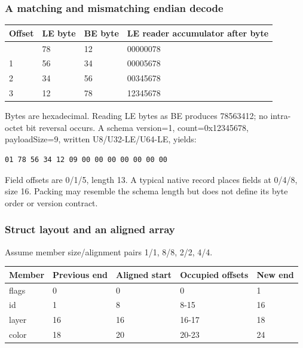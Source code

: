 \hypertarget{appendix-92ff77d4dfdc-m003---bytes-to-physical-memory}{}

\subsubsection{A matching and mismatching endian decode}\label{appendix-92ff77d4dfdc-a-matching-and-mismatching-endian-decode}

\hypertarget{appendix-92ff77d4dfdc-a-matching-and-mismatching-endian-decode}{}

{\def\LTcaptype{none} %
\begin{longtable}[]{@{}llll@{}}
\toprule\noalign{}
Offset & LE byte & BE byte & LE reader accumulator after byte \\
\midrule\noalign{}
\endhead
\bottomrule\noalign{}
\endlastfoot
0 & 78 & 12 & 00000078 \\
1 & 56 & 34 & 00005678 \\
2 & 34 & 56 & 00345678 \\
3 & 12 & 78 & 12345678 \\
\end{longtable}
}

Bytes are hexadecimal. Reading LE bytes as BE produces 78563412; no intra-octet bit reversal occurs. A schema version=1, count=0x12345678, payloadSize=9, written U8/U32-LE/U64-LE, yields:

\begin{verbatim}
01 78 56 34 12 09 00 00 00 00 00 00 00
\end{verbatim}

Field offsets are 0/1/5, length 13. A typical native record places fields at 0/4/8, size 16. Packing may resemble the schema length but does not define its byte order or version contract.

\subsubsection{Struct layout and an aligned array}\label{appendix-92ff77d4dfdc-struct-layout-and-an-aligned-array}

\hypertarget{appendix-92ff77d4dfdc-struct-layout-and-an-aligned-array}{}

Assume member size/alignment pairs 1/1, 8/8, 2/2, 4/4.

{\def\LTcaptype{none} %
\begin{longtable}[]{@{}lllll@{}}
\toprule\noalign{}
Member & Previous end & Aligned start & Occupied offsets & New end \\
\midrule\noalign{}
\endhead
\bottomrule\noalign{}
\endlastfoot
flags & 0 & 0 & 0 & 1 \\
id & 1 & 8 & 8-15 & 16 \\
layer & 16 & 16 & 16-17 & 18 \\
color & 18 & 20 & 20-23 & 24 \\
\end{longtable}
}

